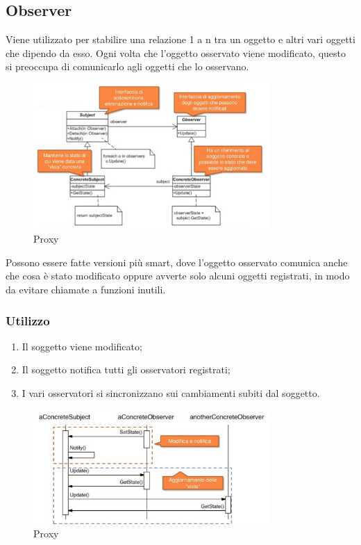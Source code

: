 \subsection{Observer}
Viene utilizzato per stabilire una relazione 1 a n tra un oggetto e altri vari oggetti che dipendo da esso.
Ogni volta che l'oggetto osservato viene modificato, questo si preoccupa di comunicarlo agli oggetti che lo osservano.

\begin{figure}[ht]
    \centering
    \includegraphics[width=0.8\textwidth]{immagini/observer.png}
    \caption{Proxy}
\end{figure}
\FloatBarrier

Possono essere fatte versioni più smart, dove l'oggetto osservato comunica anche che cosa è stato modificato oppure avverte solo alcuni oggetti registrati, in modo da evitare chiamate a funzioni inutili.

\subsubsection{Utilizzo}
\begin{enumerate}
\item Il soggetto viene modificato;
\item Il soggetto notifica tutti gli osservatori registrati;
\item I vari osservatori si sincronizzano sui cambiamenti subiti dal soggetto.
\end{enumerate}
\begin{figure}[ht]
    \centering
    \includegraphics[width=0.8\textwidth]{immagini/observerSequence.png}
    \caption{Proxy}
\end{figure}
\FloatBarrier



